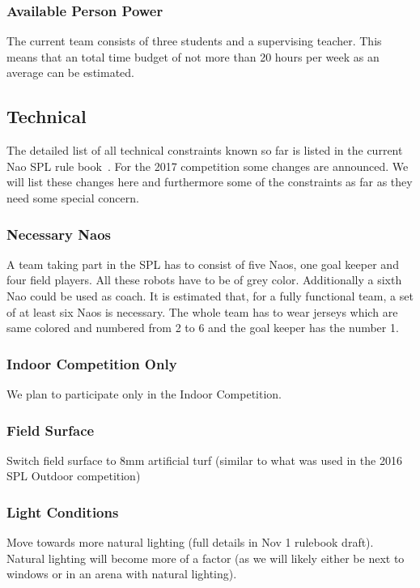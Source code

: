 \documentclass[12pt]{article}
\theoremstyle{definition}
\begin{document}
\subsubsection{Available Person Power}
The current team consists of three students and a supervising teacher. This means that an total time budget of not more than 20 hours per week as an average can be estimated.

\subsection{Technical}\label{sec:technical}
The detailed list of all technical constraints known so far is listed in the current Nao SPL rule book~\cite{robocup_technical_committee_robocup_2016}. For the 2017 competition some changes are announced. We will list these changes here and furthermore some of the constraints as far as they need some special concern.

\subsubsection{Necessary Naos}
A team taking part in the SPL has to consist of five Naos, one goal keeper and four field players. All these robots have to be of grey color. Additionally a sixth Nao could be used as coach. It is estimated that, for a fully functional team, a set of at least six Naos is necessary. The whole team has to wear jerseys which are same colored and numbered from 2 to 6 and the goal keeper has the number 1. 

\subsubsection{Indoor Competition Only}
We plan to participate only in the Indoor Competition.

\subsubsection{Field Surface}
Switch field surface to 8mm artificial turf (similar to what was used in the 2016 SPL Outdoor competition)

\subsubsection{Light Conditions}
Move towards more natural lighting (full details in Nov 1 rulebook draft). Natural lighting will become more of a factor (as we will likely either be next to windows or in an arena with natural lighting).
\end{document}
